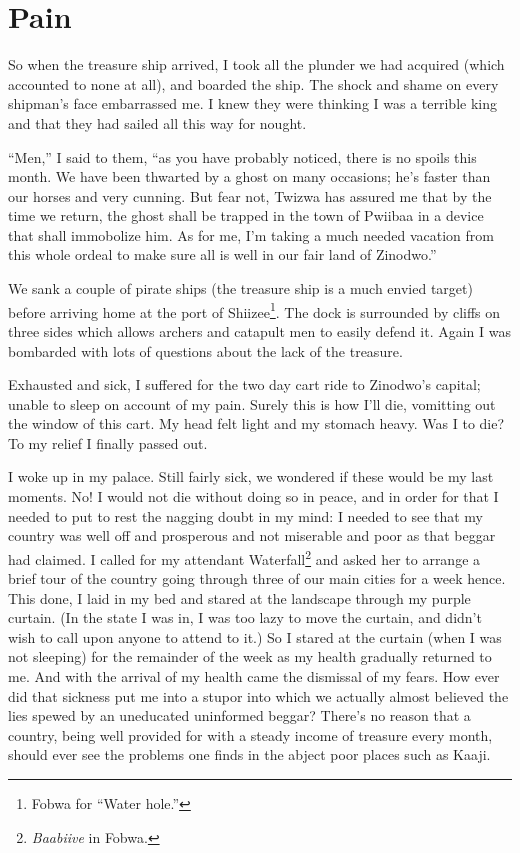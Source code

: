 \chapter{Pain}

So when the treasure ship arrived, I took all the plunder we had acquired (which accounted to none at all), and boarded the ship.
The shock and shame on every shipman's face embarrassed me. I knew they were thinking I was a terrible king and that they had sailed all this way for nought.

``Men,'' I said to them, ``as you have probably noticed, there is no spoils this month. We have been thwarted by a ghost on many occasions; he's faster than our horses and very cunning.
But fear not, Twizwa has assured me that by the time we return, the ghost shall be trapped in the town of Pwiibaa in a device that shall immobolize him.
As for me, I'm taking a much needed vacation from this whole ordeal to make sure all is well in our fair land of Zinodwo.''

We sank a couple of pirate ships (the treasure ship is a much envied target) before arriving home at the port of Shiizee\footnote{Fo\-bwa for ``Water hole.''}. The dock is surrounded by cliffs on three sides which allows archers and catapult men to easily defend it. Again I was bombarded with lots of questions about the lack of the treasure.

Exhausted and sick, I suffered for the two day cart ride to Zinodwo's capital; unable to sleep on account of my pain. Surely this is how I'll die, vomitting out the window of this cart. My head felt light and my stomach heavy. Was I to die? To my relief I finally passed out.

I woke up in my palace. Still fairly sick, we wondered if these would be my last moments. No! I would not die without doing so in peace, and in order for that I needed to put to rest the nagging doubt in my mind: I needed to see that my country was well off and prosperous and not miserable and poor as that beggar had claimed. I called for my attendant Waterfall\footnote{\emph{Baabiive} in Fobwa.} and asked her to arrange a brief tour of the country going through three of our main cities for a week hence. This done, I laid in my bed and stared at the landscape through my purple curtain. (In the state I was in, I was too lazy to move the curtain, and didn't wish to call upon anyone to attend to it.) So I stared at the curtain (when I was not sleeping) for the remainder of the week as my health gradually returned to me. And with the arrival of my health came the dismissal of my fears. How ever did that sickness put me into a stupor into which we actually almost believed the lies spewed by an uneducated uninformed beggar? There's no reason that a country, being well provided for with a steady income of treasure every month, should ever see the problems one finds in the abject poor places such as Kaaji.

